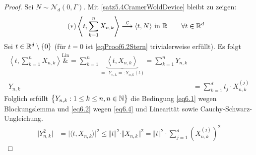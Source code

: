\begin{proof}
	Sei $N\sim\mathcal{N}_d(0,\Gamma)$. Mit \ref{satz5.4CramerWoldDevice} bleibt zu zeigen:
	\begin{align}
		\label{eqProof6.2Stern}\tag{$\ast$}
		\left\langle t,\sum\limits_{k=1}^n X_{n,k}\right\rangle\stackrel{\mathcal{L}}{\longrightarrow}\langle t,N\rangle\text{ in }\mathbb{R}\qquad\forall t\in\mathbb{R}^d
	\end{align}
	Sei $t\in\mathbb{R}^d\setminus\lbrace0\rbrace$ (für $t=0$ ist \eqref{eqProof6.2Stern} trivialerweise erfüllt). Es folgt
	\begin{align*}
		\left\langle t,\sum\limits_{k=1}^n X_{n,k}\right\rangle
		\overset{\text{Lin}}&=
		\sum\limits_{k=1}^n\underbrace{\left\langle t,X_{n,k}\right\rangle}_{=:Y_{n,k}=:Y_{n,k}(t)}
		=\sum\limits_{k=1}^n Y_{n,k}\\
		Y_{n,k}
		&=\sum\limits_{k=1}^d t_j\cdot X_{n,k}^{(j)}
	\end{align*}
	Folglich erfüllt $\big\lbrace Y_{n,k}:1\leq k\leq n,n\in\mathbb{N}\big\rbrace$ die Bedingung \eqref{eq6.1} wegen Blockungslemma und \eqref{eq6.2} wegen \eqref{eq6.4} und Linearität sowie Cauchy-Schwarz-Ungleichung.
	\begin{align*}
		\big|Y_{n,k}^2\big|&=\big|\langle t,X_{n,k}\rangle\big|^2
		\leq\Vert t\Vert^2\cdot\Vert X_{n,k}\Vert^2
		=\Vert t\Vert^2\cdot\sum\limits_{j=1}^d\left(X_{n,k}^{(j)}\right)^2
	\end{align*}
	

\end{proof}

